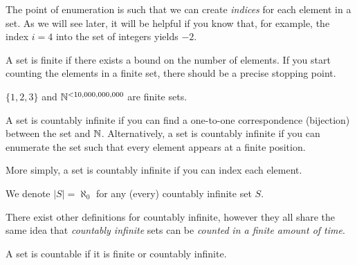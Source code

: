 \documentclass[main.tex]{subfiles}
\begin{document}
The point of enumeration is such that we can create \textit{indices} for each element in a set. As we will see later, it will be helpful if you know that, for example, the index \(i=4\) into the set of integers yields \(-2\).

\begin{defn}
	A set is finite if there exists a bound on the number of elements. If you start counting the elements in a finite set, there should be a precise stopping point.
\end{defn}

\begin{example}
	\(\{1,2,3\}\) and \(\mathbb{N}^{< 10,000,000,000}\) are finite sets.
\end{example}

\begin{defn}
	A set is countably infinite if you can find a one-to-one correspondence (bijection) between the set and \(\mathbb{N}\). Alternatively, a set is countably infinite if you can enumerate the set such that every element appears at a finite position.
	
	More simply, a set is countably infinite if you can index each element.
\end{defn}

\begin{rem}
	We denote \(|S| = \aleph_0\) for any (every) countably infinite set \(S\).
\end{rem}

There exist other definitions for countably infinite, however they all share the same idea that \textit{countably infinite} sets can be \textit{counted} \textit{in a finite amount of time}.

\begin{defn}
	A set is countable if it is finite or countably infinite.
\end{defn}



\end{document}
